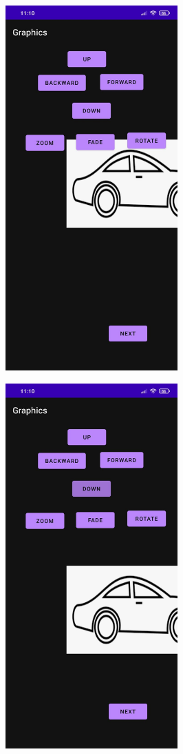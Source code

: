 \documentclass[12pt,letterpaper]{article}
\begin{document}
\begin{figure}
    \centering
    \includegraphics[height=14cm, keepaspectratio]{Outputs/OP3.jpeg}
\end{figure}
\begin{figure}
    \centering
    \includegraphics[height=14cm, keepaspectratio]{Outputs/OP4.jpeg}
\end{figure}
\end{document}
